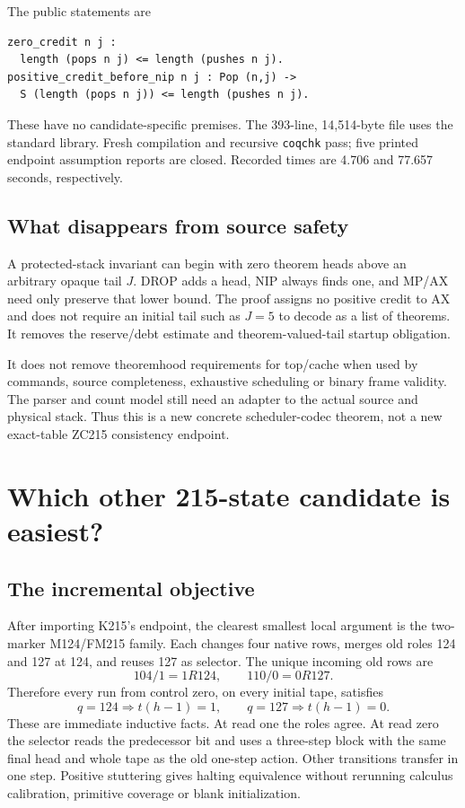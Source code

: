 \documentclass[11pt]{article}
\newcommand{\code}[1]{\texttt{\small #1}}
\begin{document}
The public statements are
\begin{Verbatim}[fontsize=\small]
zero_credit n j :
  length (pops n j) <= length (pushes n j).
positive_credit_before_nip n j : Pop (n,j) ->
  S (length (pops n j)) <= length (pushes n j).
\end{Verbatim}
These have no candidate-specific premises. The 393-line, 14,514-byte file uses
the standard library. Fresh compilation and recursive \code{coqchk} pass;
five printed endpoint assumption reports are closed. Recorded times are 4.706
and 77.657 seconds, respectively.

\subsection{What disappears from source safety}

A protected-stack invariant can begin with zero theorem heads above an arbitrary
opaque tail $J$. DROP adds a head, NIP always finds one, and MP/AX need only
preserve that lower bound. The proof assigns no positive credit to AX and does
not require an initial tail such as $J=5$ to decode as a list of theorems.
It removes the reserve/debt estimate and theorem-valued-tail startup obligation.

It does not remove theoremhood requirements for top/cache when used by commands,
source completeness, exhaustive scheduling or binary frame validity. The parser
and count model still need an adapter to the actual source and physical stack.
Thus this is a new concrete scheduler-codec theorem, not a new exact-table
ZC215 consistency endpoint.

\section{Which other 215-state candidate is easiest?}

\subsection{The incremental objective}

After importing K215's endpoint, the clearest smallest local argument is the
two-marker M124/FM215 family. Each changes four native rows, merges old roles
124 and 127 at 124, and reuses 127 as selector. The unique incoming old rows are
\[
104/1=1R124,\qquad110/0=0R127.
\]
Therefore every run from control zero, on every initial tape, satisfies
\[
q=124\Rightarrow t(h-1)=1,\qquad
q=127\Rightarrow t(h-1)=0.
\]
These are immediate inductive facts. At read one the roles agree. At read zero
the selector reads the predecessor bit and uses a three-step block with the
same final head and whole tape as the old one-step action. Other transitions
transfer in one step. Positive stuttering gives halting equivalence without
rerunning calculus calibration, primitive coverage or blank initialization.
\end{document}
